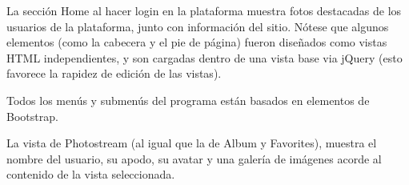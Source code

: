 \documentclass{memoria}
\begin{document}
\newpage


La sección Home al hacer login en la plataforma muestra fotos destacadas de los usuarios de la plataforma, junto con información del sitio. Nótese que algunos elementos (como la cabecera y el pie de página) fueron diseñados como vistas HTML independientes, y son cargadas dentro de una vista base via jQuery (esto favorece la rapidez de edición de las vistas).

Todos los menús y submenús del programa están basados en elementos de Bootstrap.

\newpage

La vista de Photostream (al igual que la de Album y Favorites), muestra el nombre del usuario, su apodo, su avatar y una galería de imágenes acorde al contenido de la vista seleccionada.
\end{document}

